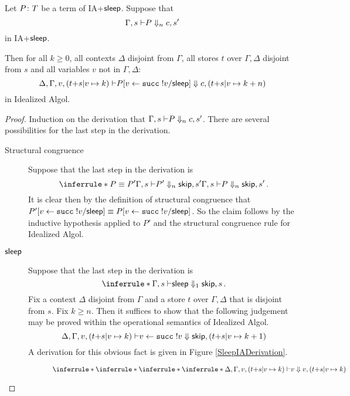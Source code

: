\documentclass{article}
\begin{document}
\begin{lemma}
  Let $P\colon T$ be a term of IA+${\mathsf{sleep}}$.
  Suppose that
  \[
    \Gamma,s{\;\vdash} P\Downarrow_n c,s'
    \]
  in IA+${\mathsf{sleep}}$.


  Then for all $k\ge 0$, all contexts $\Delta$ disjoint from $\Gamma$, all stores $t$ over $\Gamma,\Delta$ disjoint from $s$ and all variables $v$ not in $\Gamma,\Delta$:
  \[
    \Delta,\Gamma,v,(t{+}s\vert v \mapsto k){\;\vdash} P[v \gets {\mathtt{succ\;}} !v/{\mathsf{sleep}}] \Downarrow c,(t{+}s\vert v \mapsto k+n)
    \]
  in Idealized Algol.
  \label{IaSleepsSoundnessLemma}
\end{lemma}
\begin{proof}
  Induction on the derivation that $\Gamma,s{\;\vdash} P\Downarrow_n c,s'$.
  There are several possibilities for the last step in the derivation.
  \begin{description}
    \item[Structural congruence]
      Suppose that the last step in the derivation is
      \[
        \inferrule*{P\equiv P'\\
        \Gamma,s\ts P' \converges_n \skipp, s'}
        {\Gamma,s\ts P\converges_n \skipp, s'}\,.
        \]
      It is clear then by the definition of structural congruence that $P'[v\gets{\mathtt{succ\;}} !v/{\mathsf{sleep}}]\equiv P[v\gets{\mathtt{succ\;}} !v/{\mathsf{sleep}}]$.  
      So the claim follows by the inductive hypothesis applied to $P'$ and the structural congruence rule for Idealized Algol.
    \item[${\mathsf{sleep}}$]
      Suppose that the last step in the derivation is
      \[
        \inferrule*{ }
        {\Gamma,s\ts \sleep \converges_1 \skipp,s}\,.
        \]
      Fix a context $\Delta$ disjoint from $\Gamma$ and a store $t$ over $\Gamma,\Delta$ that is disjoint from $s$.  
      Fix $k\ge n$.  
      Then it suffices to show that the following judgement may be proved within the operational semantics of Idealized Algol.
      \[
        \Delta,\Gamma,v,(t{+}s\vert v\mapsto k){\;\vdash} v \gets {\mathtt{succ\;}} !v \Downarrow {\mathsf{skip}}, (t{+}s\vert v\mapsto k+1)
        \]
      A derivation for this obvious fact is given in Figure \ref{SleepIADerivation}.
      \begin{SidewaysFigure}
        \centering
        \begin{subfigure}{\textheight}
          \[
            \inferrule*
            {
              \inferrule*
              {
                \inferrule*
                {
                  \inferrule*
                  {
                  }
                  {
                    \Delta,\Gamma,v,(t{+}s\vert v\mapsto k)\ts v \converges v,(t{+}s\vert v\mapsto k)
}}}}\]
\end{subfigure}
\end{SidewaysFigure}
\end{description}
\end{proof}
\end{document}
